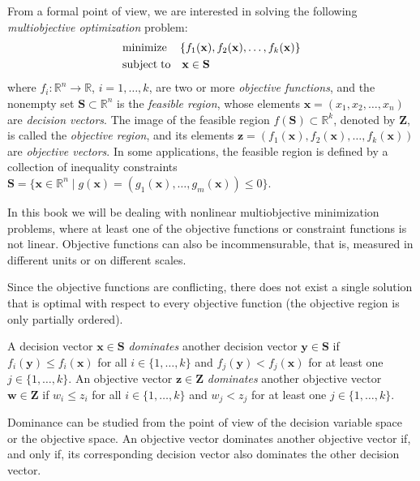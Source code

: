 From a formal point of view, we are interested in solving the following \emph{multiobjective optimization} problem:
\begin{align*}
     & \text{minimize}	  \quad \left\{f_1(\mathbf{x}), f_2(\mathbf{x}), \ldots, f_k(\mathbf{x}) \right\} \\
     & \text{subject\;to} \quad \mathbf{x} \in \mathbf{S}
\end{align*}
where $f_i:\mathbb{R}^n \rightarrow \mathbb{R}$, $i = 1, \ldots, k$, are two or more \emph{objective functions}, and the nonempty set $\mathbf{S} \subset \mathbb{R}^n$ is the \emph{feasible region}, whose elements $\mathbf{x} = \left( x_1, x_2, \ldots, x_n \right)$ are \emph{decision vectors}. The image of the feasible region $f(\mathbf{S}) \subset \mathbb{R}^k$, denoted by $\mathbf{Z}$, is called the \emph{objective region}, and its elements $\mathbf{z} = \left(f_1(\mathbf{x}), f_2(\mathbf{x}), \ldots, f_k(\mathbf{x}) \right)$ are \emph{objective vectors}. In some applications, the feasible region is defined by a collection of inequality constraints $\mathbf{S} = \{ \mathbf{x} \in \mathbb{R}^n \mid g(\mathbf{x}) = \left( g_1(\mathbf{x}), \ldots, g_m(\mathbf{x}) \right) \leq 0 \}$.

In this book we will be dealing with nonlinear multiobjective minimization problems, where at least one of the objective functions or constraint functions is not linear. Objective functions can also be incommensurable, that is, measured in different units or on different scales.

Since the objective functions are conflicting, there does not exist a single solution that is optimal with respect to every objective function (the objective region is only partially ordered). 

\begin{definition}
\label{def:multiobjective_dominance}
A decision vector $\mathbf{x} \in \mathbf{S}$ \emph{dominates} another decision vector $\mathbf{y} \in \mathbf{S}$ if $f_i(\mathbf{y}) \leq f_i(\mathbf{x})$ for all $i \in \{1, \ldots, k\}$ and $f_j(\mathbf{y}) < f_j(\mathbf{x})$ for at least one $j \in \{1, \ldots, k\}$. An objective vector $\mathbf{z} \in \mathbf{Z}$ \emph{dominates} another objective vector $\mathbf{w} \in \mathbf{Z}$ if $w_i \leq z_i$ for all $i \in \{1, \ldots, k\}$ and $w_j < z_j$ for at least one $j \in \{1, \ldots, k\}$.
\end{definition}

Dominance can be studied from the point of view of the decision variable space or the objective space. An objective vector dominates another objective vector if, and only if, its corresponding decision vector also dominates the other decision vector.

